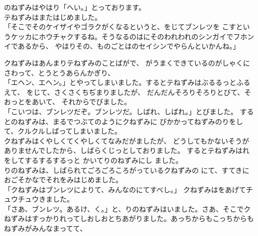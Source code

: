 \documentclass[
    a4paper,
    10pt,
    book]
    {tarticle}
\begin{document}
\indent {}のねずみはやはり「へい。」とっております。\\
\indent テねずみはまたはじめました。\\
「そこでそのケイザイやゴラクがくなるというと、をじてブンレツを
こすというケッカにホウチャクするね。そうなるのはにそのわれわれのシンガイでフホンイであるから、
やはりその、ものごとはのセイシンでやらんといかんね。」

\newpage
\thispagestyle{fancy}

\indent クねずみはあんまりテねずみのことばがで、
がうまくできているのがしゃくにさわって、とうとうあらんかぎり、\\
「エヘン、エヘン。」とやってしまいました。するとテねずみはぶるるっとふるえて、
をじて、さくさくちぢまりましたが、
だんだんそろりそろりとびて、そおっとをあいて、
それからでびました。\\
「こいつは、ブンレツだぞ。ブンレツだ。しばれ、しばれ。」とびました。
するとのねずみは、まるでつぶてのようにクねずみに
びかかってねずみのりをして、クルクルしばってしまいました。\\
\indent クねずみはくやしくてくやしくてなみだがましたが、
どうしてもかないそうがありませんでしたから、しばらくじっとしておりました。
するとテねずみはれをしてするするするっと
かいてりのねずみにし
ました。\\
\indent {}りのねずみは、しばられてごろごろころがっているクねずみの
にて、すてきにおごそかなでそれをみはじめました。\\
「クねずみはブンレツによりて、みんなのにてすべし。」
クねずみはをあげてチュウチュウきました。\\
「さあ、ブンレツ。あるけ、く。」と、りのねずみはいました。さあ、そこでクねずみはすっかりれってしおしおとちあがりました。あっちからもこっちからもねずみがみんなまってて、
\end{document}
